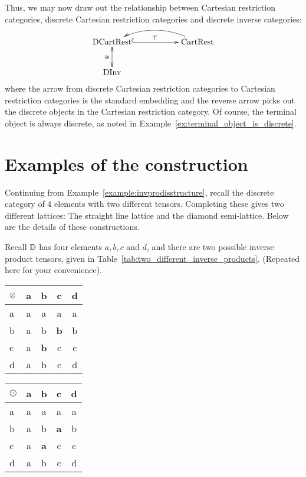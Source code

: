 Thus, we may now draw out the relationship between Cartesian restriction categories, discrete
Cartesian restriction categories and discrete inverse categories:

\[
  \xymatrix{
    \text{DCartRest} \ar@{^{(}->}[rr]^{\top} && \text{CartRest} \ar@/_15pt/[ll]\\
    \text{DInv}\ar@{<->}[u]^{\cong}
  }
\]
where the arrow from discrete Cartesian restriction categories to Cartesian restriction categories
is the standard embedding and the reverse arrow picks out the discrete objects in the Cartesian
restriction category. Of course, the terminal object is always discrete, as noted in
Example~\ref{ex:terminal_object_is_discrete}.

\section{Examples of the \texorpdfstring{\wtc}{tilde} construction} %
\label{sec:examples_of_the_wtf_construction}

\begin{example}
  \label{example:completing_a_finite_discrete_inverse_category}
\end{example}
Continuing from Example~\ref{example:invprodisstructure}, recall the discrete category of 4
elements with two different tensors. Completing these gives two different lattices:
The straight line lattice and the diamond semi-lattice. Below are the details of these constructions.

Recall $\mathbb{D}$ has four elements $a,b,c$ and $d$, and there are two possible inverse product tensors,
given in Table~\ref{tab:two_different_inverse_products}. (Repeated here for your convenience).
\begin{table*}[!htbp]
  \begin{center}
  \begin{tabular}{|l||c|c|c|c|}
    \hline
    $\otimes$&a&b&c&d\\ \hline \hline
    a&a&a&a&a\\ \hline
    b&a&b&\textbf{b}&b\\ \hline
    c&a&\textbf{b}&c&c \\ \hline
    d&a&b&c&d \\ \hline
  \end{tabular}
  \qquad
  \begin{tabular}{|l||c|c|c|c|} \hline
    $\odot$&a&b&c&d\\ \hline \hline
    a&a&a&a&a\\ \hline
    b&a&b&\textbf{a}&b\\ \hline
    c&a&\textbf{a}&c&c \\ \hline
    d&a&b&c&d \\ \hline
  \end{tabular}
  \end{center}
  \caption[]{Two different inverse products on the same category.} %
\end{table*}


